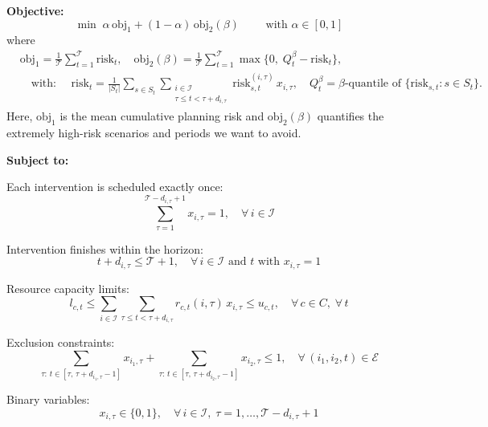 \noindent\textbf{Objective:}
\begin{equation}
\min \; \alpha\,\mathrm{obj}_1 + (1-\alpha)\,\mathrm{obj}_2(\beta) \qquad \text{ with }\alpha \in [0,1]
\label{eq:objective}
\end{equation}
where
\[
\begin{aligned}
&\mathrm{obj}_1 = \frac{1}{\mathcal{T}}\sum_{t=1}^{\mathcal{T}} \mathrm{risk}_t,\quad \mathrm{obj}_2(\beta) = \frac{1}{\mathcal{T}}\sum_{t=1}^{\mathcal{T}} \max\Big\{0,\;Q_t^\beta-\mathrm{risk}_t\Big\},\\[1ex]
&\quad\text{with: }\quad\mathrm{risk}_t = \frac{1}{|S_t|}\sum_{s\in S_t}\sum_{\substack{i\in \mathcal{I}\\ \tau \le t < \tau+d_{i,\tau}}} \mathrm{risk}_{s,t}^{(i,\tau)}\,x_{i,\tau},\quad Q_t^\beta=\beta\text{-quantile of } \Big\{\mathrm{risk}_{s,t} : s\in S_t\Big\}.
\end{aligned}
\]
\noindent Here, $\mathrm{obj}_1$ is the mean cumulative planning risk and $\mathrm{obj}_2(\beta)$ quantifies the extremely high-risk scenarios and periods we want to avoid.

\vspace{1em}
\newpage
\noindent\textbf{Subject to:}

\noindent Each intervention is scheduled exactly once:
\[
\sum_{\tau=1}^{\mathcal{T}-d_{i,\tau}+1} x_{i,\tau} = 1,\quad \forall\, i\in \mathcal{I}
\]

\noindent Intervention finishes within the horizon:
\[
t + d_{i,\tau} \le \mathcal{T}+1,\quad \forall\, i\in \mathcal{I} \text{ and } t \text{ with } x_{i,\tau}=1
\]

\noindent Resource capacity limits:
\[
l_{c,t} \le \sum_{i\in \mathcal{I}}\sum_{\tau \le t < \tau+d_{i,\tau}} r_{c,t}(i,\tau)\,x_{i,\tau} \le u_{c,t},\quad \forall\, c\in C,\; \forall\, t
\]

\noindent Exclusion constraints:
\[
\sum_{\tau:\, t\in [\tau,\,\tau+d_{i_1,\tau}-1]} x_{i_1,\tau} + \sum_{\tau:\, t\in [\tau,\,\tau+d_{i_2,\tau}-1]} x_{i_2,\tau} \le 1,\quad \forall\,(i_1,i_2,t)\in \mathcal{E}
\]

\noindent Binary variables:
\[
x_{i,\tau} \in \{0,1\},\quad \forall\, i\in \mathcal{I},\; \tau=1,\ldots,\mathcal{T}-d_{i,\tau}+1
\]


